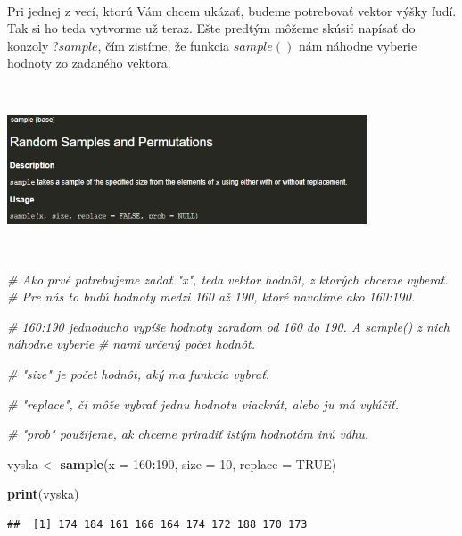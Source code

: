 \documentclass[]{article}
\newenvironment{Shaded}{\begin{snugshade}}{\end{snugshade}}
\newcommand{\CommentTok}[1]{\textcolor[rgb]{0.56,0.35,0.01}{\textit{#1}}}
\newcommand{\DataTypeTok}[1]{\textcolor[rgb]{0.13,0.29,0.53}{#1}}
\newcommand{\DecValTok}[1]{\textcolor[rgb]{0.00,0.00,0.81}{#1}}
\newcommand{\KeywordTok}[1]{\textcolor[rgb]{0.13,0.29,0.53}{\textbf{#1}}}
\newcommand{\NormalTok}[1]{#1}
\newcommand{\OperatorTok}[1]{\textcolor[rgb]{0.81,0.36,0.00}{\textbf{#1}}}
\newcommand{\OtherTok}[1]{\textcolor[rgb]{0.56,0.35,0.01}{#1}}
\newcommand{\StringTok}[1]{\textcolor[rgb]{0.31,0.60,0.02}{#1}}
\begin{document}
~

Pri jednej z vecí, ktorú Vám chcem ukázať, budeme potrebovať vektor
výšky ľudí. Tak si ho teda vytvorme už teraz. Ešte predtým môžeme skúsiť
napísať do konzoly \(?sample\), čím zistíme, že funkcia \(sample()\) nám
náhodne vyberie hodnoty zo zadaného vektora.

~

\begin{center}

\includegraphics[width=0.8\textwidth,height=\textheight]{diplomka obrazky/3.png}

\end{center}

~

\begin{Shaded}
\begin{Highlighting}[]
\CommentTok{# Ako prvé potrebujeme zadať "x", teda vektor hodnôt, z ktorých chceme vyberať.}
\CommentTok{# Pre nás to budú hodnoty medzi 160 až 190, ktoré navolíme ako 160:190.}

\CommentTok{# 160:190 jednoducho vypíše hodnoty zaradom od 160 do 190. A sample() z nich náhodne vyberie}
\CommentTok{# nami určený počet hodnôt.}


\CommentTok{# "size" je počet hodnôt, aký ma funkcia vybrať.}

\CommentTok{# "replace", či môže vybrať jednu hodnotu viackrát, alebo ju má vylúčiť.}

\CommentTok{# "prob" použijeme, ak chceme priradiť istým hodnotám inú váhu.}

\NormalTok{vyska <-}\StringTok{ }\KeywordTok{sample}\NormalTok{(}\DataTypeTok{x =} \DecValTok{160}\OperatorTok{:}\DecValTok{190}\NormalTok{, }\DataTypeTok{size =} \DecValTok{10}\NormalTok{, }\DataTypeTok{replace =} \OtherTok{TRUE}\NormalTok{)}

\KeywordTok{print}\NormalTok{(vyska)}
\end{Highlighting}
\end{Shaded}

\begin{verbatim}
##  [1] 174 184 161 166 164 174 172 188 170 173
\end{verbatim}
\end{document}
